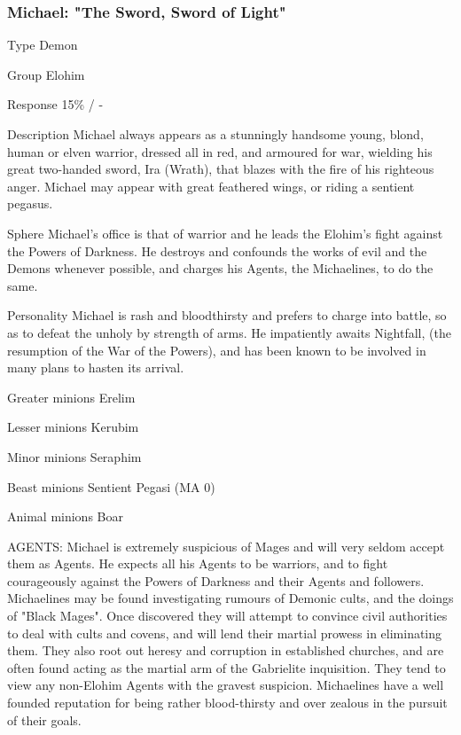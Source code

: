 \subsubsection{Michael: "The Sword, Sword of Light"}

\begin{Description}
\item[Type] Demon

\item[Group] Elohim

\item[Response] 15\% / -

\item[Description] Michael always appears as a stunningly handsome
young, blond, human or elven warrior, dressed all in red, and armoured
for war, wielding his great two-handed sword, Ira (Wrath), that blazes
with the fire of his righteous anger. Michael may appear with great
feathered wings, or riding a sentient pegasus.

\item[Sphere] Michael's office is that of warrior and he leads the
Elohim's fight against the Powers of Darkness. He destroys and
confounds the works of evil and the Demons whenever possible, and
charges his Agents, the Michaelines, to do the same.

\item[Personality] Michael is rash and bloodthirsty and prefers to
charge into battle, so as to defeat the unholy by strength of arms.
He impatiently awaits Nightfall, (the resumption of the War of the
Powers), and has been known to be involved in many plans to hasten its
arrival.

\item[Greater minions] Erelim 

\item[Lesser minions] Kerubim 

\item[Minor minions] Seraphim 

\item[Beast minions] Sentient Pegasi (MA 0)

\item[Animal minions] Boar

AGENTS: Michael is extremely suspicious of Mages and will very seldom accept them as Agents. He expects all his Agents to be warriors, and to fight courageously against the Powers of Darkness and their Agents and followers. Michaelines may be found investigating rumours of Demonic cults, and the doings of "Black Mages". Once discovered they will attempt to convince civil authorities to deal with cults and covens, and will lend their martial prowess in eliminating them. They also root out heresy and corruption in established churches, and are often found acting as the martial arm of the Gabrielite inquisition. They tend to view any non-Elohim Agents with the gravest suspicion.  Michaelines have a well founded reputation for being rather blood-thirsty and over zealous in the pursuit of their goals.


\end{Description}

